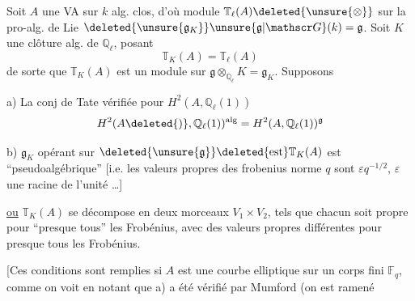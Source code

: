 Soit $A$ une VA sur $k$ alg. clos,
d'où module $\mathbb T_\ell(A)\deleted{\unsure{\otimes}}$ sur la pro-alg. de Lie $\deleted{\unsure{\mathfrak g_K}}\unsure{\mathfrak g|\mathscr G}(k)=\mathfrak g$.
Soit $K$ une clôture alg. de $\mathbb Q_\ell$, posant
\[
\mathbb T_{K}(A)=\mathbb T_\ell(A)
\]
de sorte que $\mathbb T_K(A)$ est un module sur
$\mathfrak g\otimes_{\mathbb Q_\ell}K=\mathfrak g_K$. Supposons

a) La  conj de Tate vérifiée pour $H^2(A,\mathbb Q_\ell(1))$
\[
H^2(A\deleted{)},\mathbb Q_\ell(1))^{\mathrm{alg}}=H^2(A,\mathbb Q_\ell(1))^{\mathfrak g}
\]

b) $\mathfrak g_K$ opérant sur $\deleted{\unsure{\mathfrak g}}\deleted{\text{est}}\mathbb T_K(A)$ est ``pseudoalgébrique''
[i.e. les valeurs propres des frobenius  
norme $q$ sont $\varepsilon q^{-1/2}$, $\varepsilon$ une racine de l'unité \ldots]

\uline{ou} $\mathbb T_K(A)$ se décompose en deux morceaux
$V_1\times V_2$, tels que chacun soit propre pour ``presque
tous'' les Frobénius, avec des valeurs propres
différentes pour presque tous les Frobénius.

[Ces conditions sont remplies si $A$ est une 
 courbe elliptique  sur un corps fini $\mathbb F_q$,
comme on voit en notant que a) 
a été vérifié par Mumford (on est ramené
